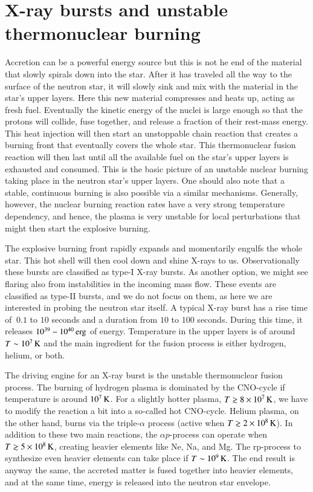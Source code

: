 \section{X-ray bursts and unstable thermonuclear burning}

Accretion can be a powerful energy source but this is not he end of the material that slowly spirals down into the star.
After it has traveled all the way to the surface of the neutron star, it will slowly sink and mix with the material in the star's upper layers.
Here this new material compresses and heats up, acting as fresh fuel.
Eventually the kinetic energy of the nuclei is large enough so that the protons will collide, fuse together, and release a fraction of their rest-mass energy.
This heat injection will then start an unstoppable chain reaction that creates a burning front that eventually covers the whole star.
This thermonuclear fusion reaction will then last until all the available fuel on the star's upper layers is exhausted and consumed.
This is the basic picture of an unstable nuclear burning taking place in the neutron star's upper layers.
One should also note that a stable, continuous burning is also possible via a similar mechanisms. 
Generally, however, the nuclear burning reaction rates have a very strong temperature dependency, and hence, the plasma is very unstable for local perturbations that might then start the explosive burning.

The explosive burning front rapidly expands and momentarily engulfs the whole star.
This hot shell will then cool down and shine X-rays to us.
Observationally these bursts are classified as type-I X-ray bursts.\cite[see][for a review]{Lewin93, SB10}
As another option, we might see flaring also from instabilities in the incoming mass flow. 
These events are classified as type-II bursts, and we do not focus on them, as here we are interested in probing the neutron star itself.
A typical X-ray burst has a rise time of $~0.1$ to $10$ seconds and a duration from $10$ to $100$ seconds.
During this time, it releases $10^{39} - 10^{40} \, \mathrm{erg}$ of energy.
Temperature in the upper layers is of around $T \sim 10^7 \, \mathrm{K}$ and the main ingredient for the fusion process is either hydrogen, helium, or both.

The driving engine for an X-ray burst is the unstable thermonuclear fusion process.\cite{Fujimoto81, Wallace81, Fisker08}
The burning of hydrogen plasma is dominated by the CNO-cycle if temperature is around $10^7 \, \mathrm{K}$.
For a slightly hotter plasma, $T \gtrsim 8 \times 10^{7} \, \mathrm{K}$, we have to modify the reaction a bit into a so-called hot CNO-cycle.\cite{FH65}
Helium plasma, on the other hand, burns via the triple-$\alpha$ process (active when $T \gtrsim 2 \times 10^{8} \, \mathrm{K}$).
In addition to these two main reactions, the $\alpha p$-process can operate when $T \gtrsim 5 \times 10^{8} \, \mathrm{K}$, creating heavier elements like Ne, Na, and Mg.
The rp-process to synthesize even heavier elements can take place if $T \sim 10^9 \, \mathrm{K}$.
The end result is anyway the same, the accreted matter is fused together into heavier elements, and at the same time, energy is released into the neutron star envelope.

